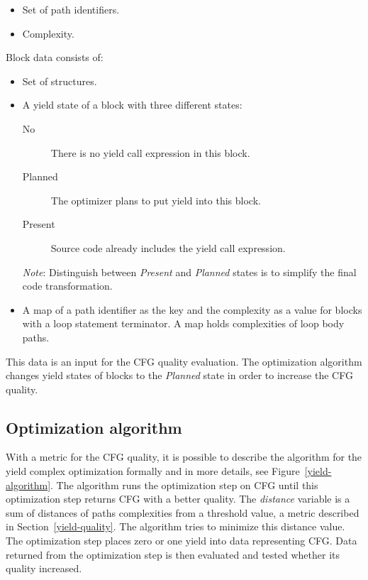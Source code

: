 \begin{itemize}
\item{Set of path identifiers.}
\item{Complexity.}
\end{itemize}
Block data consists of:
\begin{itemize}
\item{Set of  structures.}
\item{A yield state of a block with three different states:}
	\begin{description}
	\item[No]{There is no yield call expression in this block.}
	\item[Planned]{The optimizer plans to put yield into this block.}
	\item[Present]{Source code already includes the yield call expression.}
	\end{description}
	\emph{Note}: Distinguish between \emph{Present} and \emph{Planned} states is to simplify the final code transformation.
\item{A map of a path identifier as the key and the complexity as a value for blocks with a loop statement terminator. A map holds complexities of loop body paths.}
\end{itemize}

This data is an input for the CFG quality evaluation. The optimization algorithm changes yield states of blocks to the \emph{Planned} state in order to increase the CFG quality.

\subsection{Optimization algorithm}
With a metric for the CFG quality, it is possible to describe the algorithm for the yield complex optimization formally and in more details, see Figure~\ref{yield-algorithm}. The algorithm runs the optimization step on CFG until this optimization step returns CFG with a better quality. The \emph{distance} variable is a sum of distances of paths complexities from a threshold value, a metric described in Section~\ref{yield-quality}. The algorithm tries to minimize this distance value. The optimization step places zero or one yield into data representing CFG. Data returned from the optimization step is then evaluated and tested whether its quality increased.

